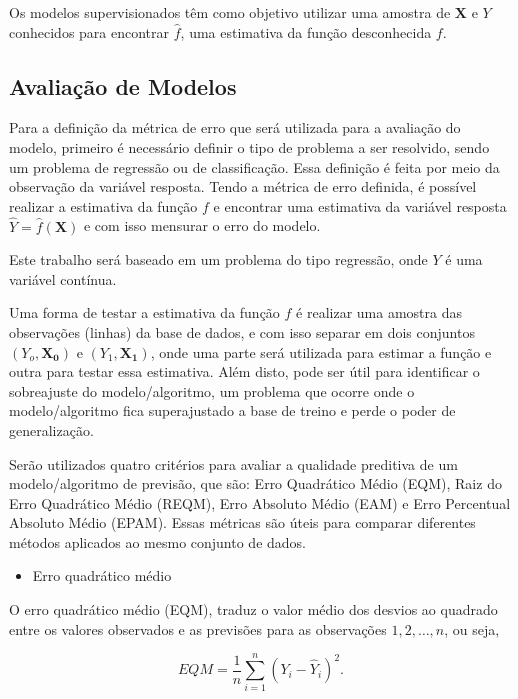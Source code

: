 \documentclass[
	12pt,				%
	a4paper,		%
	oneside,    %
	chapter=TITLE,		   %
	section=TITLE,		   %
	subsection=TITLE,	   %
	subsubsection=TITLE, %
	english,			%
	french,				%
	spanish,			%
	brazil,				%
]{abntex2}
\providecommand{\tightlist}{%
	\setlength{\itemsep}{0pt}\setlength{\parskip}{0pt}}
\begin{document}
Os modelos supervisionados têm como objetivo utilizar uma amostra de
\(\boldsymbol{X}\) e \(Y\) conhecidos para encontrar \(\hat{f}\), uma
estimativa da função desconhecida \(f\).

\hypertarget{avaliauxe7uxe3o-de-modelos}{%
\subsection{Avaliação de Modelos}\label{avaliauxe7uxe3o-de-modelos}}

Para a definição da métrica de erro que será utilizada para a avaliação
do modelo, primeiro é necessário definir o tipo de problema a ser
resolvido, sendo um problema de regressão ou de classificação. Essa
definição é feita por meio da observação da variável resposta. Tendo a
métrica de erro definida, é possível realizar a estimativa da função
\(f\) e encontrar uma estimativa da variável resposta
\(\hat{Y} = \hat{f}(\boldsymbol{X})\) e com isso mensurar o erro do
modelo.

Este trabalho será baseado em um problema do tipo regressão, onde \(Y\)
é uma variável contínua.

Uma forma de testar a estimativa da função \(f\) é realizar uma amostra
das observações (linhas) da base de dados, e com isso separar em dois
conjuntos \((Y_o, \boldsymbol{X_0})\) e \((Y_1, \boldsymbol{X_1})\),
onde uma parte será utilizada para estimar a função e outra para testar
essa estimativa. Além disto, pode ser útil para identificar o
sobreajuste do modelo/algoritmo, um problema que ocorre onde o
modelo/algoritmo fica superajustado a base de treino e perde o poder de
generalização.

Serão utilizados quatro critérios para avaliar a qualidade preditiva de
um modelo/algoritmo de previsão, que são: Erro Quadrático Médio (EQM),
Raiz do Erro Quadrático Médio (REQM), Erro Absoluto Médio (EAM) e Erro
Percentual Absoluto Médio (EPAM). Essas métricas são úteis para comparar
diferentes métodos aplicados ao mesmo conjunto de dados.

\begin{itemize}
\tightlist
\item
  Erro quadrático médio
\end{itemize}

O erro quadrático médio (EQM), traduz o valor médio dos desvios ao
quadrado entre os valores observados e as previsões para as observações
\(1, 2,\dots,n\), ou seja,

\[EQM = \frac{1}{n}\sum_{i=1}^n(Y_i - \hat{Y}_i)^2.\]
\end{document}
